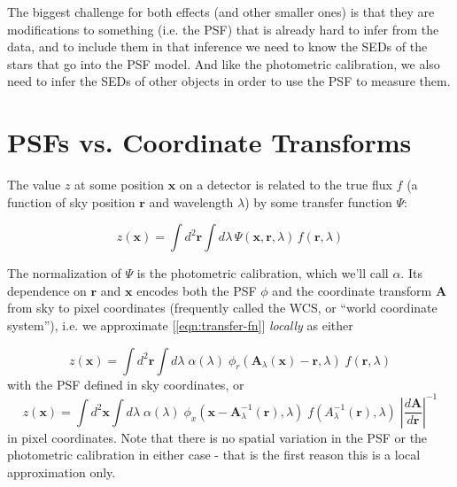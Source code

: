 \documentclass[DM,authoryear,toc]{lsstdoc}
\begin{document}
The biggest challenge for both effects (and other smaller ones) is that they are modifications to something (i.e. the PSF) that is already hard to infer from the data, and to include them in that inference we need to know the SEDs of the stars that go into the PSF model.
And like the photometric calibration, we also need to infer the SEDs of other objects in order to use the PSF to measure them.

\section{PSFs vs. Coordinate Transforms}

\label{sec:psfs-vs-coordinate-transforms}

The value $z$ at some position $\mathbf{x}$ on a detector is related to the true flux $f$ (a function of sky position $\mathbf{r}$ and wavelength $\lambda$) by some transfer function $\Psi$:

\begin{equation}
  z(\mathbf{x}) = \int\!\! d^2 \mathbf{r} \int\!\! d\!\lambda
    \, \Psi(\mathbf{x},\mathbf{r},\lambda)
    \, f(\mathbf{r},\lambda)
  \label{eqn:transfer-fn}
\end{equation}

The normalization of $\Psi$ is the photometric calibration, which we'll call $\alpha$.
Its dependence on $\mathbf{r}$ and $\mathbf{x}$ encodes both the PSF $\phi$ and the coordinate transform $\mathbf{A}$ from sky to pixel coordinates (frequently called the WCS, or ``world coordinate system''), i.e. we approximate [\ref{eqn:transfer-fn}] \emph{locally} as either

\begin{equation}
  z(\mathbf{x}) =  \int\!\! d^2 \mathbf{r} \int\!\! d\!\lambda
    \; \alpha(\lambda)
    \; \phi_r\!\left(\mathbf{A}_\lambda(\mathbf{x}) - \mathbf{r}, \lambda\right)
    \; f\!\left(\mathbf{r}, \lambda\right)
\end{equation}
with the PSF defined in sky coordinates, or
\begin{equation}
  z(\mathbf{x}) =  \int\!\! d^2 \mathbf{x} \int\!\! d\!\lambda
    \;\alpha(\lambda)
    \; \phi_x\!\left(\mathbf{x} - \mathbf{A}_\lambda^{-1}(\mathbf{r}), \lambda\right)
    \; f\!\left(A^{-1}_\lambda(\mathbf{r}), \lambda\right)
    \; \left|\frac{d \mathbf{A}}{d\mathbf{r}}\right|^{-1}
\end{equation}
in pixel coordinates.
Note that there is no spatial variation in the PSF or the photometric calibration in either case - that is the first reason this is a local approximation only.
\end{document}
